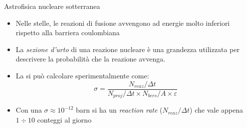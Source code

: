 \documentclass [xcolor=svgnames] {beamer}
\begin{document}
	\begin{frame}{Astrofisica nucleare sotterranea}
		\begin{itemize}
			\item<1-> Nelle stelle, le reazioni di fusione avvengono ad energie molto inferiori rispetto alla barriera coulombiana
			\item<2-> La \emph{sezione d'urto} di una reazione nucleare è una grandezza utilizzata per descrivere la probabilità che la reazione avvenga.
			\item<4-> La si può calcolare sperimentalmente come:
			\begin{equation}
				\sigma = \dfrac{N_{reaz}/\Delta t}{N_{proj}/\Delta t \times N_{bers}/A \times \varepsilon}
			\end{equation}
			\item<5-> Con una $\sigma \approx 10^{-12}$ barn si ha un \emph{reaction rate} ($N_{reaz}/\Delta t$) che vale appena $1\div 10$ conteggi al giorno %
		\end{itemize}
		

\end{frame}
\end{document}
